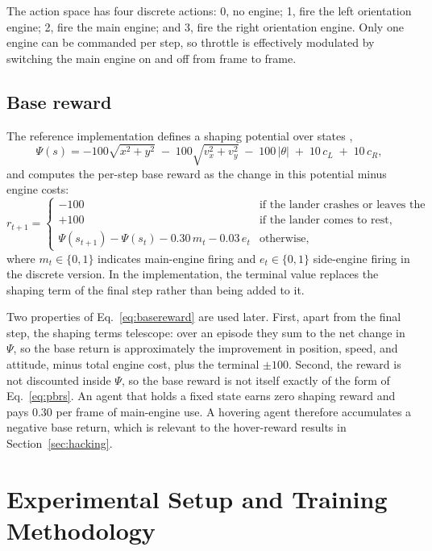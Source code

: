 \documentclass[11pt,a4paper]{article}
\begin{document}
The action space has four discrete actions: 0, no engine; 1, fire the left orientation engine; 2, fire the main engine; and 3, fire the right orientation engine. Only one engine can be commanded per step, so throttle is effectively modulated by switching the main engine on and off from frame to frame.

\subsection{Base reward}

The reference implementation defines a shaping potential over states \cite{gymSource},
\begin{equation}
  \Psi(s) = -100\sqrt{x^2+y^2} \;-\; 100\sqrt{v_x^2+v_y^2} \;-\; 100\,|\theta| \;+\; 10\,c_L \;+\; 10\,c_R, \label{eq:psi}
\end{equation}
and computes the per-step base reward as the change in this potential minus engine costs:
\begin{equation}
  r_{t+1} =
  \begin{cases}
    -100 & \text{if the lander crashes or leaves the viewport,}\\
    +100 & \text{if the lander comes to rest,}\\
    \Psi(s_{t+1})-\Psi(s_t) - 0.30\,m_t - 0.03\,e_t & \text{otherwise,}
  \end{cases} \label{eq:basereward}
\end{equation}
where $m_t\in\{0,1\}$ indicates main-engine firing and $e_t\in\{0,1\}$ side-engine firing in the discrete version. In the implementation, the terminal value replaces the shaping term of the final step rather than being added to it.

Two properties of Eq.~\eqref{eq:basereward} are used later. First, apart from the final step, the shaping terms telescope: over an episode they sum to the net change in $\Psi$, so the base return is approximately the improvement in position, speed, and attitude, minus total engine cost, plus the terminal $\pm100$. Second, the reward is not discounted inside $\Psi$, so the base reward is not itself exactly of the form of Eq.~\eqref{eq:pbrs}. An agent that holds a fixed state earns zero shaping reward and pays $0.30$ per frame of main-engine use. A hovering agent therefore accumulates a negative base return, which is relevant to the hover-reward results in Section~\ref{sec:hacking}.

\section{Experimental Setup and Training Methodology}\label{sec:setup}
\end{document}
